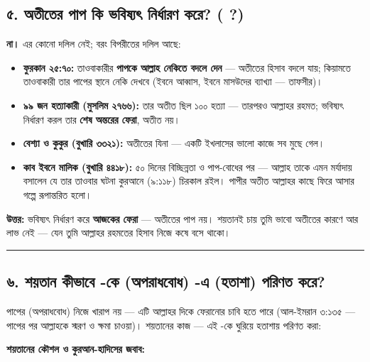 \subsection*{৫. অতীতের পাপ কি ভবিষ্যৎ নির্ধারণ করে? (     ?)}

\textbf{না।} এর কোনো দলিল নেই; বরং বিপরীতের দলিল আছে:

\begin{itemize}
\item \textbf{ফুরকান ২৫:৭০:} তাওবাকারীর \textbf{পাপকে আল্লাহ নেকিতে বদলে দেন} — অতীতের হিসাব বদলে যায়; কিয়ামতে তাওবাকারী তার পাপের স্থানে নেকি দেখবে (ইবনে আব্বাস, ইবনে মাসউদের ব্যাখ্যা — তাফসীর)।
\item \textbf{৯৯ জন হত্যাকারী (মুসলিম ২৭৬৬):} তার অতীত ছিল ১০০ হত্যা — তারপরও আল্লাহর রহমত; ভবিষ্যৎ নির্ধারণ করল তার \textbf{শেষ অন্তরের ফেরা}, অতীত নয়।
\item \textbf{বেশ্যা ও কুকুর (বুখারি ৩৩২১):} অতীতের যিনা — একটি ইখলাসের ভালো কাজে সব মুছে গেল।
\item \textbf{কাব ইবনে মালিক (বুখারি ৪৪১৮):} ৫০ দিনের বিচ্ছিন্নতা ও পাপ-বোধের পর — আল্লাহ তাকে এমন মর্যাদায় বসালেন যে তার তাওবার ঘটনা কুরআনে (৯:১১৮) চিরকাল রইল। পাপীর অতীত আল্লাহর কাছে ফিরে আসার গল্পে রূপান্তরিত হলো।
\end{itemize}
\textbf{উত্তর:} ভবিষ্যৎ নির্ধারণ করে \textbf{আজকের ফেরা} — অতীতের পাপ নয়। শয়তানই চায় তুমি ভাবো অতীতের কারণে আর লাভ নেই — যেন তুমি আল্লাহর রহমতের হিসাব নিজে কষে বসে থাকো।

\medskip\hrule\medskip

\subsection*{৬. শয়তান কীভাবে -কে (অপরাধবোধ) -এ (হতাশা) পরিণত করে?}

পাপের  (অপরাধবোধ) নিজে খারাপ নয় — এটি আল্লাহর দিকে ফেরানোর চাবি হতে পারে (আল-ইমরান ৩:১৩৫ — পাপের পর আল্লাহকে স্মরণ ও ক্ষমা চাওয়া)। শয়তানের কাজ — এই -কে ঘুরিয়ে হতাশায় পরিণত করা:

\textbf{শয়তানের কৌশল ও কুরআন-হাদিসের জবাব:}

